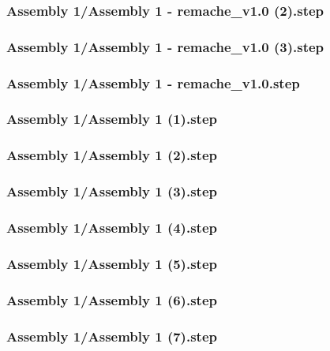\documentclass[a4paper,12pt]{article}
\begin{document}
\subsubsection{Assembly 1/Assembly 1 - remache_v1.0 (2).step}

\subsubsection{Assembly 1/Assembly 1 - remache_v1.0 (3).step}

\subsubsection{Assembly 1/Assembly 1 - remache_v1.0.step}

\subsubsection{Assembly 1/Assembly 1 (1).step}

\subsubsection{Assembly 1/Assembly 1 (2).step}

\subsubsection{Assembly 1/Assembly 1 (3).step}

\subsubsection{Assembly 1/Assembly 1 (4).step}

\subsubsection{Assembly 1/Assembly 1 (5).step}

\subsubsection{Assembly 1/Assembly 1 (6).step}

\subsubsection{Assembly 1/Assembly 1 (7).step}

\end{document}
